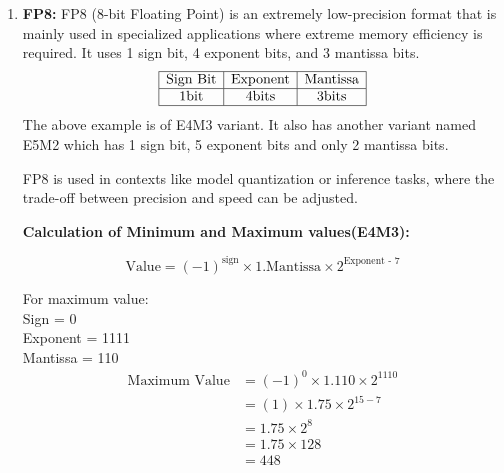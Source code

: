 \documentclass{ioereport}
\begin{document}
\begin{enumerate}[label=\textbf{\roman*.}]
\item \textbf{FP8:}
    FP8 (8-bit Floating Point) is an extremely low-precision format that is mainly used in specialized applications where extreme memory efficiency is required. It uses 1 sign bit, 4 exponent bits, and 3 mantissa bits.
    \[
    \begin{array}{|c|c|c|}
        \hline
        \text{Sign Bit} & \text{Exponent} & \text{Mantissa} \\
        \hline
        1 \text{bit} & 4 \text{bits} & 3 \text{bits} \\
        \hline
    \end{array}
    \]
    The above example is of E4M3 variant. It also has another variant named E5M2 which has 1 sign bit, 5 exponent bits and only 2 mantissa bits.
    
    FP8 is used in contexts like model quantization or inference tasks, where the trade-off between precision and speed can be adjusted.

    \textbf{Calculation of Minimum and Maximum values(E4M3):}
    
    \[
    \text{Value} = (-1)^{\text{sign}} \times 1.\text{Mantissa} \times 2^{\text{Exponent - 7}}
    \]

    For maximum value:\\
    Sign = 0 \\
    Exponent = 1111 \\
    Mantissa = 110
    \[
    \begin{aligned}
        \text{Maximum Value} &= (-1)^{0} \times 1.110 \times 2^{1110} \\
        &= (1) \times 1.75 \times 2^{15 - 7} \\
        &= 1.75 \times 2^{8} \\
        &= 1.75 \times 128 \\
        &= 448
    \end{aligned}
    \]
    

\end{enumerate}
\end{document}
